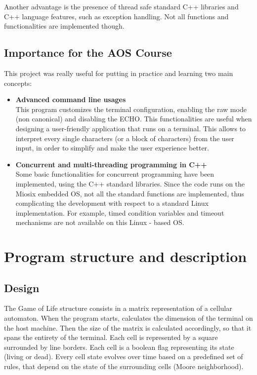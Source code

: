 \documentclass[10pt]{article}
\begin{document}
Another advantage is the presence of thread safe standard C++ libraries and C++ language features, such as exception handling. Not all functions and functionalities are implemented though.

\subsection{Importance for the AOS Course}

This project was really useful for putting in practice and learning two main concepts:
\begin{itemize}
    \item \textbf{Advanced command line usages}\\
    This program customizes the terminal configuration, enabling the raw mode (non canonical) and disabling the ECHO. This functionalities are useful
    when designing a user-friendly application that runs on a terminal. This allows to interpret every single characters (or a block of characters) from the user
    input, in order to simplify and make the user experience better.

    \item \textbf{Concurrent and multi-threading programming in C++}\\
    Some basic functionalities for concurrent programming have been implemented, using the C++ standard libraries. 
    Since the code runs on the Miosix embedded OS, not all the standard functions are implemented, thus complicating the development with respect to a standard Linux implementation. For example, timed condition variables and timeout mechanisms are not available on this Linux - based OS.
\end{itemize}

\newpage

\section{Program structure and description}

\subsection{Design}
The Game of Life structure consists in a matrix representation of a cellular automaton. When the program starts, calculates the dimension of the terminal
on the host machine. Then the size of the matrix is calculated accordingly, so that it spans the entirety of the terminal. Each cell is represented by a square surrounded by line borders.
Each cell is a boolean flag representing its state (living or dead). Every cell state evolves over time based on a predefined set of rules, that depend on the
state of the surrounding cells (Moore neighborhood).
\end{document}
